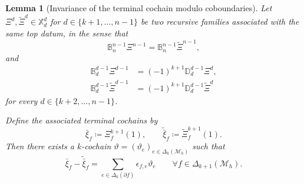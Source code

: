 \documentclass[a4paper,11pt]{article}
\newtheorem{lemma}[theorem]{Lemma}
\theoremstyle{definition}
\newcommand{\Mh}{\mathcal{M}_h}
\newcommand{\FM}[1]{\Delta_{#1}}
\begin{document}
\begin{lemma}[Invariance of the terminal cochain modulo coboundaries]
\label{lem:terminal.class.invariance}
Let $\Xi^d,\widetilde\Xi^d\in\mathbb X_d^d$ for $d\in\{k+1,\ldots,n-1\}$ be two recursive families associated with the same top datum, in the sense that
\begin{equation}\label{eq:same.top.datum}
  \mathbb B_n^{n-1}\Xi^{n-1}
  =
  \mathbb B_n^{n-1}\widetilde\Xi^{n-1},
\end{equation}
and
\begin{equation}\label{eq:two.recursive.families}
\begin{aligned}
  \mathbb B_d^{d-1}\Xi^{d-1}
  &=
  (-1)^{k+1}
  \mathbb D_d^{d-1}\Xi^d,
  \\
  \mathbb B_d^{d-1}\widetilde\Xi^{d-1}
  &=
  (-1)^{k+1}
  \mathbb D_d^{d-1}\widetilde\Xi^d
\end{aligned}
\end{equation}
for every $d\in\{k+2,\ldots,n-1\}$.

Define the associated terminal cochains by
\[
  \bar\xi_f
  \coloneqq
  \Xi_f^{k+1}(1),
  \qquad
  \widetilde{\bar\xi}_f
  \coloneqq
  \widetilde\Xi_f^{k+1}(1).
\]
Then there exists a $k$-cochain $\vartheta=(\vartheta_e)_{e\in\FM{k}(\Mh)}$ such that
\[
  \bar\xi_f-\widetilde{\bar\xi}_f
  =
  \sum_{e\in\FM{k}(\partial f)}
  \epsilon_{f,e}\vartheta_e
  \qquad
  \forall f\in\FM{k+1}(\Mh).
\]
\end{lemma}
\end{document}
